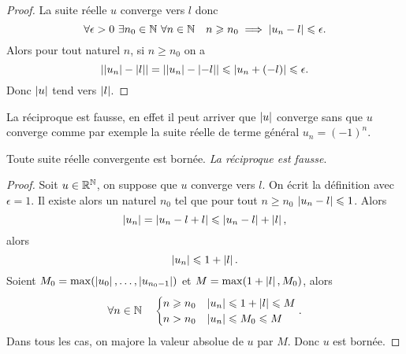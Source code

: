 \begin{proof}
  La suite réelle \(u\) converge vers \(l\) donc
  \begin{equation}
    \forall \epsilon>0 \ \exists n_0 \in \mathbb{N} \ \forall n \in \mathbb{N} \quad n\geqslant n_0 \implies \left\lvert u_n-l\right\rvert\leqslant \epsilon.
  \end{equation}
  Alors pour tout naturel \(n\), si \(n\geqslant n_0\) on a
  \begin{equation}
    \left\lvert\left\lvert u_n\right\rvert-\left\lvert l\right\rvert\right\rvert = \left\lvert\left\lvert u_n\right\rvert-\left\lvert-l\right\rvert\right\rvert\leqslant \left\lvert u_n+(-l)\right\rvert\leqslant \epsilon.
  \end{equation}
  Donc \(\left\lvert u\right\rvert\) tend vers \(\left\lvert l\right\rvert\).
\end{proof}
La réciproque est fausse, en effet il peut arriver que \(\left\lvert u\right\rvert\) converge sans que \(u\) converge comme par exemple la suite réelle de terme général \(u_n = (-1)^n\).
\begin{prop}
  Toute suite réelle convergente est bornée. \emph{La réciproque est fausse}.
\end{prop}
\begin{proof}
  Soit \(u\in \mathbb{R}^{\mathbb{N}}\), on suppose que \(u\) converge vers \(l\). On écrit la définition avec \(\epsilon = 1\). Il existe alors un naturel \(n_0\) tel que pour tout \(n\geqslant n_0\) \(\left\lvert u_n-l\right\rvert\leqslant 1\). Alors
  \begin{equation}
    \left\lvert u_n\right\rvert = \left\lvert u_n-l+l\right\rvert\leqslant \left\lvert u_n-l\right\rvert+\left\lvert l\right\rvert,
  \end{equation}
  alors
  \begin{equation}
    \left\lvert u_n\right\rvert\leqslant 1+\left\lvert l\right\rvert.
  \end{equation}
  Soient \(M_0 = \max(\left\lvert u_0\right\rvert,\ldots,\left\lvert u_{n_0-1}\right\rvert)\) et \(M = \max(1+\left\lvert l\right\rvert,M_0)\), alors
  \begin{equation}
    \forall n \in \mathbb{N} \quad
    \begin{cases}
      n \geqslant n_0 & \left\lvert u_n\right\rvert\leqslant 1+\left\lvert l\right\rvert\leqslant M \\
      n>n_0 & \left\lvert u_n\right\rvert\leqslant M_0\leqslant M
    \end{cases}.
  \end{equation}
  Dans tous les cas, on majore la valeur absolue de \(u\) par \(M\). Donc \(u\) est bornée.
\end{proof}


